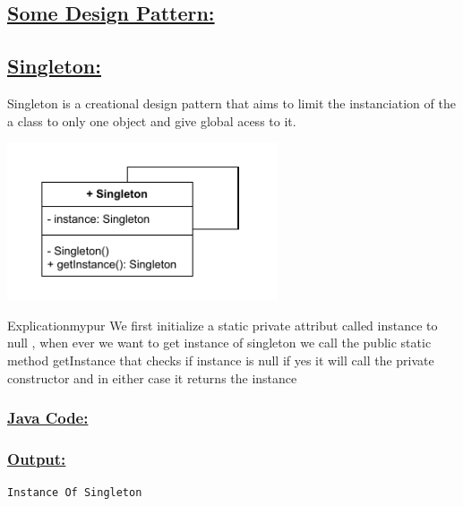 \newpage
\subsection*{\underline{Some Design Pattern:}}

\subsection*{\underline{Singleton:}}
Singleton is a creational design pattern that aims to limit the instanciation
of the a class to only one object and give global acess to it.

\begin{center}
\includegraphics[width=0.6\textwidth,height=0.35\textheight]{Chapters/DesignPattern/Singleton/single.drawio.pdf}
\end{center}

\begin{prettyBox}{Explication}{mypur}
We first initialize a static private attribut called instance to null , when ever we want to get instance of singleton
we call the public static method getInstance that checks if instance is null if yes it will call the private constructor
and in either case it returns the instance 
\end{prettyBox}

\vspace{0.25cm}
\subsubsection*{\underline{Java Code:}}






\subsubsection*{\underline{Output:}}
\begin{lstlisting}[style=cmd]
Instance Of Singleton
\end{lstlisting}

